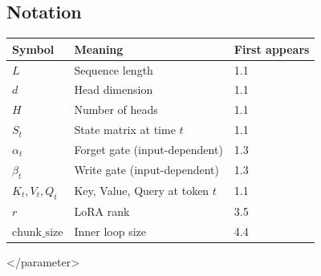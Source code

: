 \subsection{Notation}

\begin{table}[H]
\centering
\small
\begin{tabular}{lll}
\toprule
\textbf{Symbol} & \textbf{Meaning} & \textbf{First appears} \\
\midrule
$L$ & Sequence length & 1.1 \\
$d$ & Head dimension & 1.1 \\
$H$ & Number of heads & 1.1 \\
$S_t$ & State matrix at time $t$ & 1.1 \\
$\alpha_t$ & Forget gate (input-dependent) & 1.3 \\
$\beta_t$ & Write gate (input-dependent) & 1.3 \\
$K_t, V_t, Q_t$ & Key, Value, Query at token $t$ & 1.1 \\
$r$ & LoRA rank & 3.5 \\
$\text{chunk\_size}$ & Inner loop size & 4.4 \\
\bottomrule
\end{tabular}
\end{table}
</parameter>

